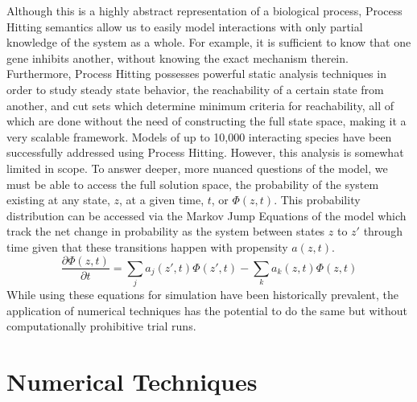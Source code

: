 \documentclass[en]{jdoc}
\begin{document}
Although this is a highly abstract representation of a biological process, Process Hitting semantics allow us to easily model interactions with only partial knowledge of the system as a whole. For example, it is sufficient to know that one gene inhibits another, without knowing the exact mechanism therein. Furthermore, Process Hitting possesses powerful static analysis techniques in order to study steady state behavior, the reachability of a certain state from another, and cut sets which determine minimum criteria for reachability, all of which are done without the need of constructing the full state space, making it a very scalable framework. Models of up to 10,000 interacting species have been successfully addressed using Process Hitting. However, this analysis is somewhat limited in scope. To answer deeper, more nuanced questions of the model, we must be able to access the full solution space, the probability of the system existing at any state, $z$, at a given time, $t$, or $\Phi(z,t)$. This probability distribution can be accessed via the Markov Jump Equations of the model which track the net change in probability as the system between states $z$ to $z\prime$ through time given that these transitions happen with propensity $a(z,t)$.
\[
\frac{\partial \Phi(z,t)}{\partial t} = \sum_j  a_j(z\prime,t)\Phi(z\prime,t) -\sum_k a_k(z,t)\Phi(z,t)
\]
While using these equations for simulation have been historically prevalent, the application of numerical techniques has the potential to do the same but without computationally prohibitive trial runs.
\section{Numerical Techniques}
\end{document}
